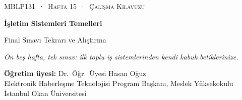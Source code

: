 \documentclass[11pt,a4paper]{article}
\begin{document}
\setlength{\emergencystretch}{3em}
\newcommand{\gantt}[2]{%
\begin{tikzpicture}[x=#1cm,y=1cm]
\foreach \p/\a/\b in {#2} {
  \fill[col\p] (\a,0) rectangle (\b,0.62);
  \draw[white,line width=1.2pt] (\a,0) -- (\a,0.62);
  \node[font=\small\bfseries,text=txt\p] at ({(\a+\b)/2},0.31) {\p};
  \draw[muted] (\a,0) -- (\a,-0.1) node[below,font=\scriptsize,text=muted,inner sep=1.5pt] {\a};
  \draw[muted] (\b,0) -- (\b,-0.1) node[below,font=\scriptsize,text=muted,inner sep=1.5pt] {\b};
}
\end{tikzpicture}}
\newcommand{\nw}[1]{\textbf{\color{mintdeep}#1}}
\newcommand{\F}{\textcolor{red!70!black}{\textbf{F}}}
\newcommand{\pts}[1]{\hfill\textcolor{mintdeep}{\textbf{[#1~puan]}}}

\thispagestyle{empty}
\begin{tcolorbox}[enhanced,colback=dark,colframe=dark,arc=0pt,boxrule=0pt,
  left=18pt,right=18pt,top=20pt,bottom=20pt,coltext=white]
{\small\color{mint}\textsc{MBLP131 \,·\, Hafta 15 \,·\, Çalışma Kılavuzu}}\par\medskip
{\headfont\fontsize{26}{30}\selectfont\bfseries İşletim Sistemleri Temelleri}\par\medskip
{\large Final Sınavı Tekrarı ve Alıştırma}\par\smallskip
{\small\itshape\color{white!70} On beş hafta, tek sınav: ilk toplu iş sistemlerinden kendi kabuk betiklerinize.}
\end{tcolorbox}

\vspace{0.4em}
\begin{minipage}[t]{0.70\linewidth}
\small
\textbf{Öğretim üyesi:} Dr.\ Öğr.\ Üyesi Hasan Oğuz\\
Elektronik Haberleşme Teknolojisi Program Başkanı, Meslek Yüksekokulu\\
İstanbul Okan Üniversitesi
\end{minipage}
\end{document}
